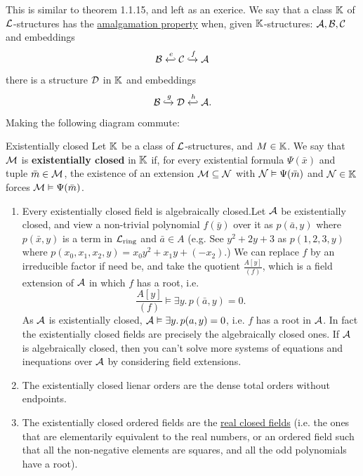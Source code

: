 \documentclass{article}
\numberwithin{thm}{subsection}
\begin{document}
\proof This is similar to theorem 1.1.15, and left as an exerice.
\endproof
We say that a class $\mathbb{K}$ of $\mathcal{L}$-structures has the \underline{amalgamation property} when, given $\mathbb{K}$-structures: $\mathcal{A}, \mathcal{B}, \mathcal{C}$ and embeddings \[ \calB \xhookleftarrow{e}\calC \xhookrightarrow{f} \calA \] there is a structure $\mathcal{D}$ in $\mathbb{K}$ and embeddings \[ \calB \xhookrightarrow{g} \calD \xhookleftarrow{h} \calA.\] Making the following diagram commute:
\begin{center}
\end{center} 
\begin{fancydefine}{Existentially closed}
    Let $\mathbb{K}$ be a class of $\mathcal{L}$-structures, and $M \in \mathbb{K}$. We say that $\mathcal{M}$ is \textbf{existentially closed} in $\mathbb{K}$ if, for every existential formula $\Psi(\bar x)$ and tuple $\bar m \in \mathcal{M}$, the existence of an extension $\mathcal{M} \subseteq \mathcal{N}$ with $\mathcal{N} \vDash \Psi(\bar m)$ and $\mathcal{N} \in \mathbb{K}$ forces $\mathcal{M} \vDash \Psi(\bar m)$.
\end{fancydefine}
\begin{exs} \hspace{0.1cm}
    \begin{enumerate}
        \item[(a)] Every existentially closed field is algebraically closed.\gap Let $\mathcal{A}$ be existentially closed, and view a non-trivial polynomial $f( \bar y)$ over it as $p(\bar a, y)$ where $p(\bar x,y)$ is a term in $\mathcal{L}_{\text{ring}}$ and $\bar a \in A$ (e.g.  See $y^{2} + 2y +3$ as $p(1,2,3,y)$ where $p(x_{0},x_{1},x_{2},y)=x_{0}y^{2}+x_{1}y+(-x_{2}).$) We can replace $f$ by an irreducible factor if need be, and take the quotient $\frac{A[y]}{(f)}$, which is a field extension of $\mathcal{A}$ in which $f$ has a root, i.e. \[ \frac{A[y]}{(f)} \models \exists y.\, p(\bar a, y)=0.\] As $\mathcal{A}$ is existentially closed, $\mathcal{A} \vDash \exists y.\, p(a,y) =0$, i.e. $f$ has a root in $\mathcal{A}$. In fact the existentially closed fields are precisely the algebraically closed ones. If $\mathcal{A}$ is algebraically closed, then you can't solve more systems of equations and inequations over $\mathcal{A}$ by considering field extensions.
        \item[(b)] The existentially closed lienar orders are the dense total orders without endpoints.
        \item[(c)] The existentially closed ordered fields are the \underline{real closed fields} (i.e. the ones that are elementarily equivalent to the real numbers, or an ordered field such that all the non-negative elements are squares, and all the odd polynomials have a root).
    \end{enumerate}
\end{exs}
\end{document}
